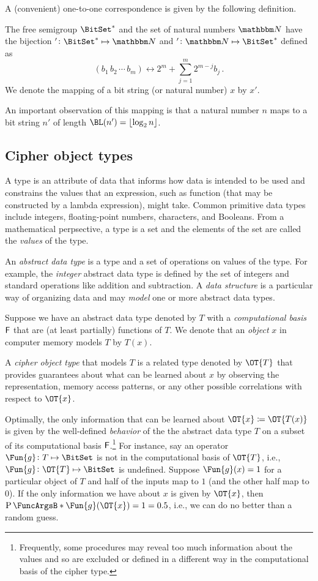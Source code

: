 \documentclass[ ../main.tex]{subfiles}
\begin{document}
A (convenient) one-to-one correspondence is given by the following definition.
\begin{definition}
\label{def:mapping}
The free semigroup $\BitSet^{*}$ and the set of natural numbers $\NatSet$ have the bijection $' \colon \BitSet^* \mapsto \NatSet$ and $' \colon \NatSet \mapsto \BitSet^*$ defined as
\begin{equation}
	(b_1 \, b_2 \, \cdots \, b_m) \longleftrightarrow 2^m + \sum_{j=1}^{m} 2^{m - j} b_j\,.
\end{equation}
We denote the mapping of a bit string (or natural number) $x$ by $x'$.
\end{definition}
An important observation of this mapping is that a natural number $n$ maps to a bit string $n'$ of length $\BL(n') = \lfloor \log_2 n \rfloor$.

\subsection{Cipher object types}
A type is an attribute of data that informs how data is intended to be used and constrains the values that an expression, such as function (that may be constructed by a lambda expression), might take.
Common primitive data types include integers, floating-point numbers, characters, and Booleans.
From a mathematical perpsective, a type is a set and the elements of the set are called the \emph{values} of the type.

An \emph{abstract data type} is a type and a set of operations on values of the type.
For example, the \emph{integer} abstract data type is defined by the set of integers and standard operations like addition and subtraction.
A \emph{data structure} is a particular way of organizing data and may \emph{model} one or more abstract data types.

Suppose we have an abstract data type denoted by $T$ with a \emph{computational basis} $\Set{F}$ that are (at least partially) functions of $T$.
We denote that an \emph{object} $x$ in computer memory models $T$ by $T(x)$.

A \emph{cipher object type}\cite{obtype} that models $T$ is a related type denoted by $\OT{T}$ that provides guarantees about what can be learned about $x$ by observing the representation, memory access patterns, or any other possible correlations with respect to $\OT{x}$.

Optimally, the only information that can be learned about $\OT{x} \coloneqq \OT{T(x)}$ is given by the well-defined \emph{behavior} of the the abstract data type $T$ on a subset of its computational basis $\Set{F}$.\footnote{
Frequently, some procedures may reveal too much information about the values and so are excluded or defined in a different way in the computational basis of the cipher type.}
For instance, say an operator $\Fun{g} \colon T \mapsto \BitSet$ is not in the computational basis of $\OT{T}$, i.e., $\Fun{g} \colon \OT{T} \mapsto \BitSet$ is undefined.
Suppose $\Fun{g}(x) = 1$ for a particular object of $T$ and half of the inputs map to $1$ (and the other half map to $0$).
If the only information we have about $x$ is given by $\OT{x}$, then $\Prob{\Fun{g}(\OT{x})=1} = 0.5$, i.e., we can do no better than a random guess.
\end{document}
